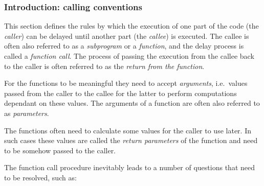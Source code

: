 \hypertarget{functions:introduction}{
	\subsubsection{Introduction: calling conventions}
}

This section defines the rules by which the execution of one part of the code
(the \textit{caller}) can be delayed until another part (the \textit{callee})
is executed.
The callee is often also referred to as a \textit{subprogram} or
a \textit{function}, and the delay process is called a \textit{function call}.
The process of passing the execution from the callee back to the caller
is often referred to as the \textit{return from the function}.

For the functions to be meaningful they need to accept \textit{arguments},
i.e.\ values passed from the caller to the callee for the latter to perform
computations dependant on these values.
The arguments of a function are often
also referred to as \textit{parameters}.

The functions often need to calculate some values for the caller to use later.
In such cases these values are called the \textit{return parameters}
of the function and need to be somehow passed to the caller.

The function call procedure inevitably leads to a number of questions that
need to be resolved, such as:

